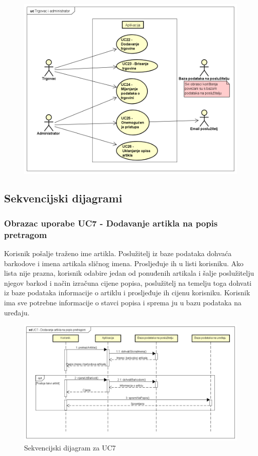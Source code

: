 			    \begin{figure}[H]
			        \begin{center}
		            \includegraphics[width=.9\linewidth]{dijagrami/uc_trg_i_admin.png}
		            \label{fig:uc_trg_i_admin}
	                \end{center}
	            \end{figure}
	        
				\eject		
				
			\subsection{Sekvencijski dijagrami}
				
				\subsubsection{Obrazac uporabe UC7 - Dodavanje artikla na popis pretragom}
				    Korisnik pošalje traženo ime artikla. Poslužitelj iz baze podataka dohvaća barkodove i imena artikala sličnog imena. Prosljeđuje ih u listi korisniku. Ako lista nije prazna, korisnik odabire jedan od ponuđenih artikala i šalje poslužitelju njegov barkod i način izračuna cijene popisa, poslužitelj na temelju toga dohvati iz baze podataka informacije o artiklu i prosljeđuje ih cijenu korisniku. Korisnik ima sve potrebne informacije o stavci popisa i sprema ju u bazu podataka na uređaju.
	    \begin{figure}[H]
		    \centering
			\includegraphics[width=0.9\linewidth]{dijagrami/sd_uc7.png}
			\caption{Sekvencijski dijagram za UC7}
			\label{fig:sd_uc7}
		\end{figure}
		
